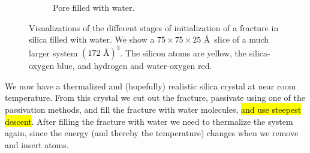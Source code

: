 \begin{figure}[htpb]
\begin{subfigure}[t]{\myfigwidth}
        \caption{%
            Pore filled with water.%
            \label{fig:initialization_step05}%
        }%
        \hspace{8pt}
    \end{subfigure}%
    \captionsetup{width=\textwidth}%
    \caption{%
        Visualizations of the different stages of initialization of a fracture in silica filled with water. We show a $75\times 75\times 25$ \AA\ slice of a much larger system $(172 \text{ \AA})^3$. The silicon atoms are yellow, the silica-oxygen blue, and hydrogen and water-oxygen red. %
        \label{fig:initialization_steps}%
    }%
\end{figure}%

We now have a thermalized and (hopefully) realistic silica crystal at near room temperature. From this crystal we cut out the fracture, passivate using one of the passivation methods, and fill the fracture with water molecules, \hl{and use steepest descent}. After filling the fracture with water we need to thermalize the system again, since the energy (and thereby the temperature) changes when we remove and insert atoms.


